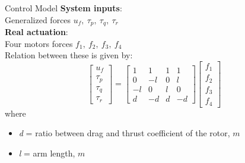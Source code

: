 \begin{frame}{Control Model}
\textbf{System inputs}:\\ Generalized forces $ u_f, \ \tau_p, \ \tau_q, \ \tau_r $\\
\bigskip 
\textbf{Real actuation}:\\
Four motors forces $ f_1, \ f_2, \ f_3, \ f_4 $\\
\bigskip
Relation between these is given by:
\begin{equation}
\begin{bmatrix}
u_f \\ \tau_p \\ \tau_q \\ \tau_r
\end{bmatrix} = 
\begin{bmatrix}
1 & 1 & 1 & 1 \\
0 & -l & 0 & l \\
-l & 0 & l & 0 \\
d & -d & d & -d
\end{bmatrix}
\begin{bmatrix}
f_1 \\ f_2 \\ f_3 \\ f_4
\end{bmatrix}
\label{force_mapping}
\end{equation}
where
\begin{itemize}
\item \textit{d} = ratio between drag and thrust coefficient of the rotor, $ m $
\item \textit{l} = arm length, $ m $
\end{itemize}

\end{frame}